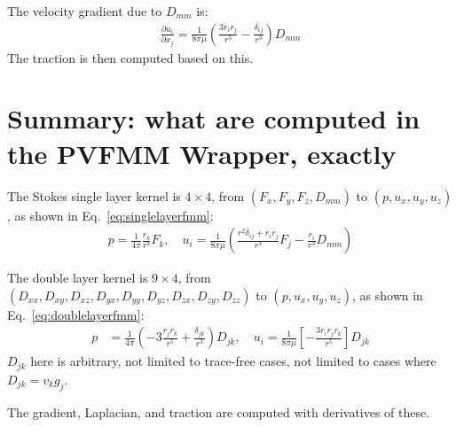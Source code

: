 \documentclass[11pt]{article}
\newcommand{\dpone}[2]{\ensuremath{\displaystyle\frac{\partial {#1}}{\partial {#2}}}}
\begin{document}
The velocity gradient due to $D_{mm}$ is:
\begin{align}
\dpone{u_i}{x_j} = \frac{1}{8\pi\mu}\left(\frac{3r_ir_j}{r^5}-\frac{\delta_{ij}}{r^3}\right)D_{mm}
\end{align}
The traction is then computed based on this.

\section{Summary: what are computed in the PVFMM Wrapper, exactly}
The Stokes single layer kernel is $4\times4$, from $(F_x,F_y,F_z,D_{mm})$ to $(p,u_x,u_y,u_z)$, as shown in Eq.~\ref{eq:singlelayerfmm}:
\begin{align}
p=\frac{1}{4\pi} \frac{r_k}{r^3} F_k,\quad u_i = \frac{1}{8\pi\mu}\left(\frac{r^2\delta_{ij}+r_ir_j}{r^3} F_j -\frac{r_i}{r^3}D_{mm}\right)
\end{align}

The double layer kernel is $9\times4$, from $(D_{xx},D_{xy},D_{xz},D_{yx},D_{yy},D_{yz},D_{zx},D_{zy},D_{zz})$ to $(p,u_x,u_y,u_z)$, as shown in Eq.~\ref{eq:doublelayerfmm}:
\begin{align} 
p& =\frac{1}{4\pi}\left(-3\frac{r_jr_k}{r^5} + \frac{\delta_{jk}}{r^3}\right)D_{jk}, \quad u_i = \frac{1}{8\pi\mu}\left[ - \frac{3r_ir_jr_k}{r^5} \right] D_{jk}
\end{align}
$D_{jk}$ here is arbitrary, not limited to trace-free cases, not limited to cases where $D_{jk}=v_kg_j$.

The gradient, Laplacian, and traction are computed with derivatives of these.
\end{document}
